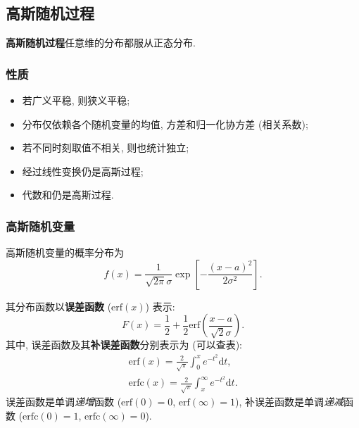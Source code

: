 \subsection{高斯随机过程}
\textbf{高斯随机过程}\quad 任意维的分布都服从正态分布.

\subsubsection{性质}
\begin{itemize}
    \item 若广义平稳, 则狭义平稳;
    \item 分布仅依赖各个随机变量的均值, 方差和归一化协方差 (相关系数);
    \item 若不同时刻取值不相关, 则也统计独立;
    \item 经过线性变换仍是高斯过程;
    \item 代数和仍是高斯过程.
\end{itemize}

\subsubsection{高斯随机变量}
高斯随机变量的概率分布为
\begin{equation}
    f(x)=\frac{1}{\sqrt{2\pi}\sigma}\exp\left[-\frac{(x-a)^2}{2\sigma^2}\right].
\end{equation}

其分布函数以\textbf{误差函数} ($\mathrm{erf}(x)$) 表示:
\begin{equation}
    F(x)=\frac{1}{2}+\frac{1}{2}\mathrm{erf}\left(\frac{x-a}{\sqrt{2}\sigma}\right).
\end{equation}
其中, 误差函数及其\textbf{补误差函数}分别表示为 (可以查表):
\begin{align}
    \mathrm{erf}(x)=\frac{2}{\sqrt{\pi}}\int_{0}^{x}e^{-t^2}\mathrm{d}t, \\
    \mathrm{erfc}(x)=\frac{2}{\sqrt{\pi}}\int_{x}^{\infty}e^{-t^2}\mathrm{d}t.
\end{align}
误差函数是单调\textit{递增}函数 ($\mathrm{erf}(0)=0$, $\mathrm{erf}(\infty)=1$), 补误差函数是单调\textit{递减}函数 ($\mathrm{erfc}(0)=1$, $\mathrm{erfc}(\infty)=0$).
